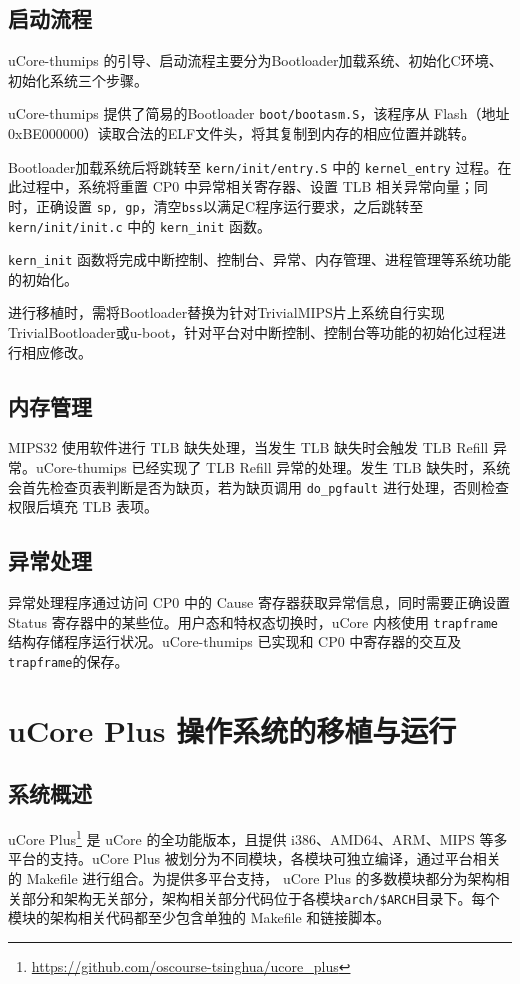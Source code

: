 \subsection{启动流程}
uCore-thumips 的引导、启动流程主要分为Bootloader加载系统、初始化C环境、初始化系统三个步骤。

uCore-thumips 提供了简易的Bootloader \texttt{boot/bootasm.S}，该程序从 Flash（地址0xBE000000）读取合法的ELF文件头，将其复制到内存的相应位置并跳转。

Bootloader加载系统后将跳转至 \texttt{kern/init/entry.S} 中的 \texttt{kernel\_entry} 过程。在此过程中，系统将重置 CP0 中异常相关寄存器、设置 TLB 相关异常向量；同时，正确设置 \texttt{sp, gp}，清空\texttt{bss}以满足C程序运行要求，之后跳转至 \texttt{kern/init/init.c} 中的 \texttt{kern\_init} 函数。

\texttt{kern\_init} 函数将完成中断控制、控制台、异常、内存管理、进程管理等系统功能的初始化。

进行移植时，需将Bootloader替换为针对TrivialMIPS片上系统自行实现TrivialBootloader或u-boot，针对平台对中断控制、控制台等功能的初始化过程进行相应修改。

\subsection{内存管理}

MIPS32 使用软件进行 TLB 缺失处理，当发生 TLB 缺失时会触发 TLB Refill 异常。uCore-thumips 已经实现了 TLB Refill 异常的处理。发生 TLB 缺失时，系统会首先检查页表判断是否为缺页，若为缺页调用 \texttt{do\_pgfault} 进行处理，否则检查权限后填充 TLB 表项。

\subsection{异常处理}
异常处理程序通过访问 CP0 中的 Cause 寄存器获取异常信息，同时需要正确设置 Status 寄存器中的某些位。用户态和特权态切换时，uCore 内核使用 \texttt{trapframe} 结构存储程序运行状况。uCore-thumips 已实现和 CP0 中寄存器的交互及\texttt{trapframe}的保存。

\section{uCore Plus 操作系统的移植与运行}
\subsection{系统概述}
uCore Plus\footnote{\url{https://github.com/oscourse-tsinghua/ucore_plus}} 是 uCore 的全功能版本，且提供 i386、AMD64、ARM、MIPS 等多平台的支持。uCore Plus 被划分为不同模块，各模块可独立编译，通过平台相关的 Makefile 进行组合。为提供多平台支持， uCore Plus 的多数模块都分为架构相关部分和架构无关部分，架构相关部分代码位于各模块\texttt{arch/\$ARCH}目录下。每个模块的架构相关代码都至少包含单独的 Makefile 和链接脚本。

